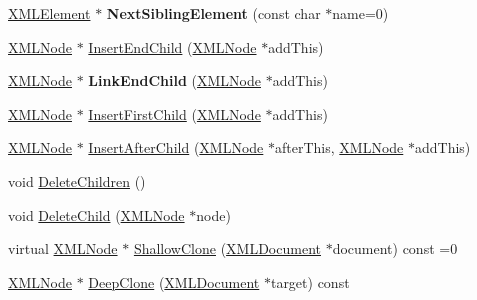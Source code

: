 \begin{DoxyCompactItemize}
\mbox{\label{classtinyxml2_1_1_x_m_l_node_af1225412584d4a2126f55e96a12e0ec0}} 
\mbox{\hyperlink{classtinyxml2_1_1_x_m_l_element}{X\+M\+L\+Element}} $\ast$ {\bfseries Next\+Sibling\+Element} (const char $\ast$name=0)
\item 
\mbox{\hyperlink{classtinyxml2_1_1_x_m_l_node}{X\+M\+L\+Node}} $\ast$ \mbox{\hyperlink{classtinyxml2_1_1_x_m_l_node_ae3b422e98914d6002ca99bb1d2837103}{Insert\+End\+Child}} (\mbox{\hyperlink{classtinyxml2_1_1_x_m_l_node}{X\+M\+L\+Node}} $\ast$add\+This)
\item 
\mbox{\label{classtinyxml2_1_1_x_m_l_node_a663e3a5a378169fd477378f4d17a7649}} 
\mbox{\hyperlink{classtinyxml2_1_1_x_m_l_node}{X\+M\+L\+Node}} $\ast$ {\bfseries Link\+End\+Child} (\mbox{\hyperlink{classtinyxml2_1_1_x_m_l_node}{X\+M\+L\+Node}} $\ast$add\+This)
\item 
\mbox{\hyperlink{classtinyxml2_1_1_x_m_l_node}{X\+M\+L\+Node}} $\ast$ \mbox{\hyperlink{classtinyxml2_1_1_x_m_l_node_ac609a8f3ea949027f439280c640bbaf2}{Insert\+First\+Child}} (\mbox{\hyperlink{classtinyxml2_1_1_x_m_l_node}{X\+M\+L\+Node}} $\ast$add\+This)
\item 
\mbox{\hyperlink{classtinyxml2_1_1_x_m_l_node}{X\+M\+L\+Node}} $\ast$ \mbox{\hyperlink{classtinyxml2_1_1_x_m_l_node_a9275138a1b8dd5d8e2c26789bdc23ac8}{Insert\+After\+Child}} (\mbox{\hyperlink{classtinyxml2_1_1_x_m_l_node}{X\+M\+L\+Node}} $\ast$after\+This, \mbox{\hyperlink{classtinyxml2_1_1_x_m_l_node}{X\+M\+L\+Node}} $\ast$add\+This)
\item 
void \mbox{\hyperlink{classtinyxml2_1_1_x_m_l_node_a0360085cc54df5bff85d5c5da13afdce}{Delete\+Children}} ()
\item 
void \mbox{\hyperlink{classtinyxml2_1_1_x_m_l_node_a363b6edbd6ebd55f8387d2b89f2b0921}{Delete\+Child}} (\mbox{\hyperlink{classtinyxml2_1_1_x_m_l_node}{X\+M\+L\+Node}} $\ast$node)
\item 
virtual \mbox{\hyperlink{classtinyxml2_1_1_x_m_l_node}{X\+M\+L\+Node}} $\ast$ \mbox{\hyperlink{classtinyxml2_1_1_x_m_l_node_a8402cbd3129d20e9e6024bbcc0531283}{Shallow\+Clone}} (\mbox{\hyperlink{classtinyxml2_1_1_x_m_l_document}{X\+M\+L\+Document}} $\ast$document) const =0
\item 
\mbox{\hyperlink{classtinyxml2_1_1_x_m_l_node}{X\+M\+L\+Node}} $\ast$ \mbox{\hyperlink{classtinyxml2_1_1_x_m_l_node_a3bb369fd733f1989b751d99a9417adab}{Deep\+Clone}} (\mbox{\hyperlink{classtinyxml2_1_1_x_m_l_document}{X\+M\+L\+Document}} $\ast$target) const

\end{DoxyCompactItemize}
